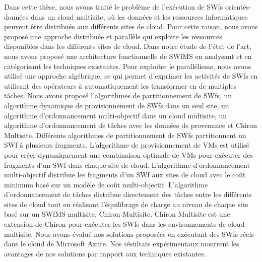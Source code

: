 Dans cette thèse, nous avons traité le problème de l'exécution de SWfs orientés-données dans un cloud multisite, où les données et les ressources informatiques peuvent être distribués aux différents sites de cloud.
Pour cette raison, nous avons proposé une approche distribuée et parallèle qui exploite les ressources disponibles dans les différents sites de cloud.
Dans notre étude de l'état de l'art, nous avons proposé une architecture fonctionnelle de SWfMS en analysant et en catégorisant les techniques existantes.
Pour exploiter le parallélisme, nous avons utilisé une approche algébrique, ce qui permet d'exprimer les activités de SWfs en utilisant des opérateurs à automatiquement les transformer en de multiples tâches.
Nous avons proposé l'algorithmes de partitionnement de SWfs, un algorithme dynamique de provisionnement de SWfs dans un seul site, un algorithme d'ordonnancement multi-objectif dans un cloud multisite, un algorithme d'ordonnancement de tâches avec les données de provenance et Chiron Multisite.
Différents algorithmes de partitionnement de SWfs partitionnent un SWf à plusieurs fragments.
L'algorithme de provisionnement de VMs est utilisé pour créer dynamiquement une combinaison optimale de VMs pour exécuter des fragments d'un SWf dans chaque site de cloud.
L'algorithme d'ordonnancement multi-objectif distribue les fragments d'un SWf aux sites de cloud avec le coût minimum basé sur un modèle de coût multi-objectif.
L'algorithme d'ordonnancement de tâches distribue directement des tâches entre les différents sites de cloud tout en réalisant l'équilibrage de charge au niveau de chaque site basé sur un SWfMS multisite, Chiron Multisite.
Chiron Multisite est une extension de Chiron pour exécuter les SWfs dans les environnements de cloud multisite.
Nous avons évalué nos solutions proposées en exécutant des SWfs réels dans le cloud de Microsoft Azure. Nos résultats expérimentaux montrent les avantages de nos solutions par rapport aux techniques existantes.


